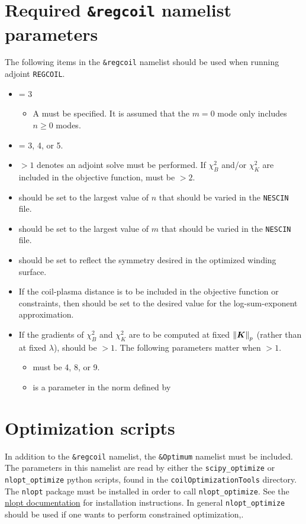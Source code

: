 \section{Required \texttt{\&regcoil} namelist parameters}
The following items in the \texttt{\&regcoil} namelist should be used when running adjoint \texttt{REGCOIL}.
\begin{itemize}
\item {} = 3 
    \begin{itemize}
    \item A  must be specified. It is assumed that the $m=0$ mode only includes $n\geq0$ modes. 
    \end{itemize}
\item {} = 3, 4, or 5.
\item {} $>1$ denotes an adjoint solve must be performed. If $\chi^2_B$ and/or $\chi^2_K$ are included in the objective function,  must be $>2$.
\item {} should be set to the largest value of $n$ that should be varied in the \texttt{NESCIN} file.
\item {} should be set to the largest value of $m$ that should be varied in the \texttt{NESCIN} file. 
\item {} should be set to reflect the symmetry desired in the optimized winding surface. 
\item If the coil-plasma distance is to be included in the objective function or constraints, then  should be set to the desired value for the log-sum-exponent approximation. 
\item If the gradients of $\chi^2_B$ and $\chi^2_K$ are to be computed at fixed $\norm{\bm{K}}_p$ (rather than at fixed $\lambda$),  should be $>1$. The following parameters matter when  $>1$. 
	\begin{itemize}
	\item {} must be 4, 8, or 9. 
	\item {} is a parameter in the norm defined by 
	\end{itemize}
\end{itemize}

\section{Optimization scripts}
In addition to the \texttt{\&regcoil} namelist, the \texttt{\&Optimum} namelist must be included. The parameters in this namelist are read by either the \texttt{scipy\_optimize} or \texttt{nlopt\_optimize} python scripts, found in the \texttt{coilOptimizationTools} directory. The \texttt{nlopt} package must be installed in order to call \texttt{nlopt\_optimize}. See the \href{https://nlopt.readthedocs.io/en/latest/#download-and-installation}{nlopt documentation} for installation instructions. In general \texttt{nlopt\_optimize} should be used if one wants to perform constrained optimization,.

